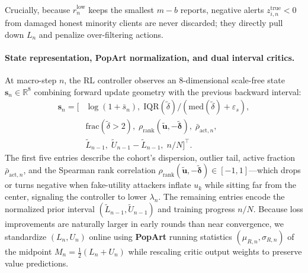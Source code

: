 Crucially, because $\hat{r}_n^{\mathrm{low}}$ keeps the smallest $m-b$ reports, negative alerts $z_{i,n}^{\mathrm{true}} < 0$ from damaged honest minority clients are never discarded; they directly pull down $L_n$ and penalize over-filtering actions.

\paragraph{State representation, PopArt normalization, and dual interval critics.}
At macro-step $n$, the RL controller observes an $8$-dimensional scale-free state $\mathbf{s}_n \in \mathbb{R}^8$ combining forward update geometry with the previous backward interval:
\begin{equation}
\begin{aligned}
    \mathbf{s}_n = \big[
        &\log(1 + \bar{s}_n),\;
        \mathrm{IQR}(\tilde{\delta}) / (\mathrm{med}(\tilde{\delta})+\varepsilon_s), \\
        &\mathrm{frac}(\tilde{\delta} > 2),\;
        \rho_{\mathrm{rank}}(\tilde{\mathbf{u}}, -\tilde{\boldsymbol{\delta}}),\;
        \bar{\rho}_{\mathrm{act}, n}, \\
        &\tilde{L}_{n-1},\;
        \tilde{U}_{n-1} - \tilde{L}_{n-1},\;
        n/N
    \big]^\top.
\end{aligned}
    \label{eq:state_v2}
\end{equation}
The first five entries describe the cohort's dispersion, outlier tail, active fraction $\bar{\rho}_{\mathrm{act},n}$, and the Spearman rank correlation $\rho_{\mathrm{rank}}(\tilde{\mathbf{u}}, -\tilde{\boldsymbol{\delta}}) \in [-1, 1]$---which drops or turns negative when fake-utility attackers inflate $u_k$ while sitting far from the center, signaling the controller to lower $\lambda_n$. The remaining entries encode the normalized prior interval $(\tilde{L}_{n-1}, \tilde{U}_{n-1})$ and training progress $n/N$. Because loss improvements are naturally larger in early rounds than near convergence, we standardize $(L_n, U_n)$ online using \textbf{PopArt} running statistics $(\mu_{R,n}, \sigma_{R,n})$ of the midpoint $M_n = \frac{1}{2}(L_n + U_n)$ while rescaling critic output weights to preserve value predictions.

